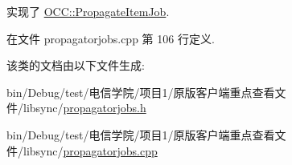 实现了 \hyperlink{class_o_c_c_1_1_propagate_item_job_a97e7a37e51ad1696f6590dd52080f10a}{O\+C\+C\+::\+Propagate\+Item\+Job}.



在文件 propagatorjobs.\+cpp 第 106 行定义.



该类的文档由以下文件生成\+:\begin{DoxyCompactItemize}
\item 
bin/\+Debug/test/电信学院/项目1/原版客户端重点查看文件/libsync/\hyperlink{propagatorjobs_8h}{propagatorjobs.\+h}\item 
bin/\+Debug/test/电信学院/项目1/原版客户端重点查看文件/libsync/\hyperlink{propagatorjobs_8cpp}{propagatorjobs.\+cpp}\end{DoxyCompactItemize}
